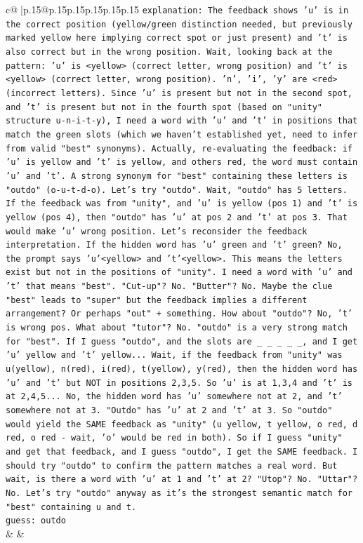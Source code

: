 \documentclass{article}
\begin{document}
{\begin{supertabular}{c@{$\;$}|p{.15\linewidth}@{}p{.15\linewidth}p{.15\linewidth}p{.15\linewidth}p{.15\linewidth}p{.15\linewidth}}
{{{                \texttt{explanation: The feedback shows 'u' is in the correct position (yellow/green distinction needed, but previously marked yellow here implying correct spot or just present) and 't' is also correct but in the wrong position. Wait, looking back at the pattern: 'u' is <yellow> (correct letter, wrong position) and 't' is <yellow> (correct letter, wrong position). 'n', 'i', 'y' are <red> (incorrect letters). Since 'u' is present but not in the second spot, and 't' is present but not in the fourth spot (based on "unity" structure u{-}n{-}i{-}t{-}y), I need a word with 'u' and 't' in positions that match the green slots (which we haven't established yet, need to infer from valid "best" synonyms). Actually, re{-}evaluating the feedback: if 'u' is yellow and 't' is yellow, and others red, the word must contain 'u' and 't'. A strong synonym for "best" containing these letters is "outdo" (o{-}u{-}t{-}d{-}o). Let's try "outdo". Wait, "outdo" has 5 letters. If the feedback was from "unity", and 'u' is yellow (pos 1) and 't' is yellow (pos 4), then "outdo" has 'u' at pos 2 and 't' at pos 3. That would make 'u' wrong position. Let's reconsider the feedback interpretation. If the hidden word has 'u' green and 't' green? No, the prompt says 'u'<yellow> and 't'<yellow>. This means the letters exist but not in the positions of "unity". I need a word with 'u' and 't' that means "best". "Cut{-}up"? No. "Butter"? No. Maybe the clue "best" leads to "super" but the feedback implies a different arrangement? Or perhaps "out" + something. How about "outdo"? No, 't' is wrong pos. What about "tutor"? No. "outdo" is a very strong match for "best". If I guess "outdo", and the slots are \_ \_ \_ \_ \_, and I get 'u' yellow and 't' yellow... Wait, if the feedback from "unity" was u(yellow), n(red), i(red), t(yellow), y(red), then the hidden word has 'u' and 't' but NOT in positions 2,3,5. So 'u' is at 1,3,4 and 't' is at 2,4,5... No, the hidden word has 'u' somewhere not at 2, and 't' somewhere not at 3. "Outdo" has 'u' at 2 and 't' at 3. So "outdo" would yield the SAME feedback as "unity" (u yellow, t yellow, o red, d red, o red {-} wait, 'o' would be red in both). So if I guess "unity" and get that feedback, and I guess "outdo", I get the SAME feedback. I should try "outdo" to confirm the pattern matches a real word. But wait, is there a word with 'u' at 1 and 't' at 2? "Utop"? No. "Uttar"? No. Let's try "outdo" anyway as it's the strongest semantic match for "best" containing u and t.} \\
\texttt{guess: outdo} \\
            }
        }
    }
    & & \\ \\


\end{supertabular}}
\end{document}
